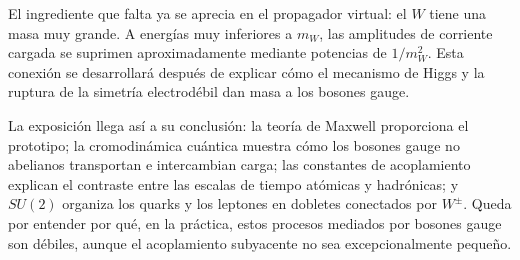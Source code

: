 El ingrediente que falta ya se aprecia en el propagador virtual: el \(W\) tiene una masa muy grande. A energías muy inferiores a \(m_W\), las amplitudes de corriente cargada se suprimen aproximadamente mediante potencias de \(1/m_W^2\). Esta conexión se desarrollará después de explicar cómo el mecanismo de Higgs y la ruptura de la simetría electrodébil dan masa a los bosones gauge.

\begin{classroomqa}
\end{classroomqa}

La exposición llega así a su conclusión: la teoría de Maxwell proporciona el prototipo; la cromodinámica cuántica muestra cómo los bosones gauge no abelianos transportan e intercambian carga; las constantes de acoplamiento explican el contraste entre las escalas de tiempo atómicas y hadrónicas; y \(SU(2)\) organiza los quarks y los leptones en dobletes conectados por \(W^\pm\). Queda por entender por qué, en la práctica, estos procesos mediados por bosones gauge son débiles, aunque el acoplamiento subyacente no sea excepcionalmente pequeño.
